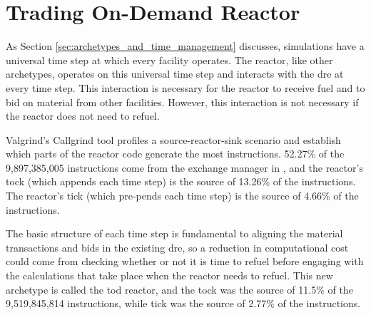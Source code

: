 \section{Trading On-Demand Reactor}
\label{sec:trading_reactor}

As Section \ref{sec:archetypes_and_time_management} discusses, \cyclus simulations have a universal time step at which every facility operates. The \cycamore reactor, like other archetypes, operates on this universal time step and interacts with the \gls{dre} at every time step. This interaction is necessary for the reactor to receive fuel and to bid on material from other facilities. However, this interaction is not necessary if the reactor does not need to refuel.

Valgrind's \cite{valgrind} Callgrind \cite{callgrind} tool profiles a source-reactor-sink scenario and establish which parts of the \cycamore reactor code generate the most instructions. 52.27\% of the 9,897,385,005 instructions come from the exchange manager in \cyclus, and the reactor's tock (which appends each time step) is the source of 13.26\% of the instructions. The reactor's tick (which pre-pends each time step) is the source of 4.66\% of the instructions.

The basic structure of each time step is fundamental to aligning the material transactions and bids in the existing \gls{dre}, so a reduction in computational cost could come from checking whether or not it is time to refuel before engaging with the calculations that take place when the reactor needs to refuel. This new archetype is called the \gls{tod} reactor, and the tock was the source of 11.5\% of the 9,519,845,814 instructions, while tick was the source of 2.77\% of the instructions.



